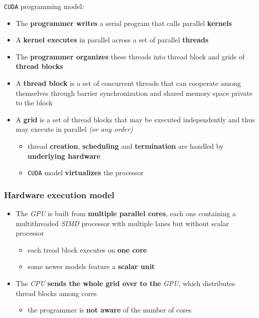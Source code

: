 \documentclass[english]{article}
\begin{document}
\bigskip
\texttt{CUDA} programming model:

\begin{itemize}
  \item The \textbf{programmer writes} a serial program that calls parallel \textbf{kernels}
  \item A \textbf{kernel executes} in parallel across a set of parallel \textbf{threads}
  \item The \textbf{programmer organizes} these threads into thread block and grids of \textbf{thread blocks}
  \item A \textbf{thread block} is a set of concurrent threads that can cooperate among themselves through barrier synchronization and shared memory space private to the block
  \item A \textbf{grid} is a set of thread blocks that may be executed independently and thus may execute in parallel \textit{(or any order)}
        \begin{itemize}
          \item thread \textbf{creation}, \textbf{scheduling} and \textbf{termination} are handled by \textbf{underlying hardware}
          \item \texttt{CUDA} model \textbf{virtualizes} the processor
        \end{itemize}
\end{itemize}

\subsubsection{Hardware execution model}
\label{sec:hardware-execution-model}

\begin{itemize}
  \item The \textit{GPU} is built from \textbf{multiple parallel cores}, each one containing a multithreaded \textit{SIMD} processor with multiple lanes but without scalar processor
        \begin{itemize}
          \item each tread block executes on \textbf{one core}
          \item some newer models feature a \textbf{scalar unit}
        \end{itemize}
  \item The \textit{CPU} \textbf{sends the whole grid over to the} \textit{GPU}, which distributes thread blocks among cores
        \begin{itemize}
          \item the programmer is \textbf{not aware} of the number of cores
        \end{itemize}
\end{itemize}
\end{document}
